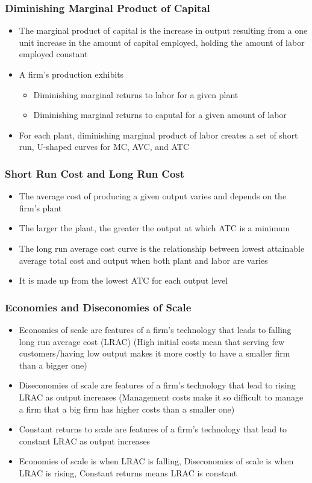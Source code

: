 \documentclass[11pt]{article}
\begin{document}
\subsubsection{Diminishing Marginal Product of Capital}
\label{sec:orgf360bef}
\begin{itemize}
\item The marginal product of capital is the increase in output resulting from a one unit increase in the amount of capital employed, holding the amount of labor employed constant
\item A firm's production exhibits
\begin{itemize}
\item Diminishing marginal returns to labor for a given plant
\item Diminishing marginal returns to caputal for a given amount of labor
\end{itemize}
\item For each plant, diminishing marginal product of labor creates a set of short run, U-shaped curves for MC, AVC, and ATC
\end{itemize}
\subsubsection{Short Run Cost and Long Run Cost}
\label{sec:orgefea989}
\begin{itemize}
\item The average cost of producing a given output varies and depends on the firm's plant
\item The larger the plant, the greater the output at which ATC is a minimum
\item The long run average cost curve is the relationship between lowest attainable average total cost and output when both plant and labor are varies
\item It is made up from the lowest ATC for each output level
\end{itemize}
\subsubsection{Economies and Diseconomies of Scale}
\label{sec:org20110ef}
\begin{itemize}
\item Economies of scale are features of a firm's technology that leads to falling long run average cost (LRAC) (High initial costs mean that serving few customers/having low output makes it more costly to have a smaller firm than a bigger one)
\item Diseconomies of scale are features of a firm's technology that lead to rising LRAC as output increases (Management costs make it so difficult to manage a firm that a big firm has higher costs than a smaller one)
\item Constant returns to scale are features of a firm's technology that lead to constant LRAC as output increases
\item Economies of scale is when LRAC is falling, Diseconomies of scale is when LRAC is rising, Constant returns means LRAC is constant
\end{itemize}
\end{document}
